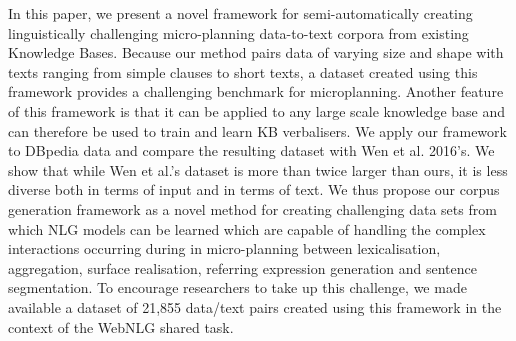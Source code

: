 In this paper, we present a novel framework for semi-automatically creating linguistically challenging micro-planning data-to-text corpora from existing Knowledge Bases. Because our method pairs data of varying size and shape with texts ranging from simple clauses to short texts, a dataset created using this framework provides a challenging benchmark for microplanning. Another feature of this framework is that it can be applied to any large scale knowledge base and can therefore be used to train and learn KB verbalisers.  We apply our framework to DBpedia data and compare the resulting dataset with Wen et al. 2016's. We show that while Wen et al.'s dataset is more than twice larger than ours, it is less diverse both in terms of input and in terms of text. We thus propose our corpus generation framework as a novel method for creating challenging data sets from which NLG models can be learned which are capable of handling the complex interactions occurring during in micro-planning between lexicalisation, aggregation, surface realisation, referring expression generation and sentence segmentation. To encourage researchers to take up this challenge, we made available a dataset of 21,855 data/text pairs created using this framework in the context of the WebNLG shared task.

